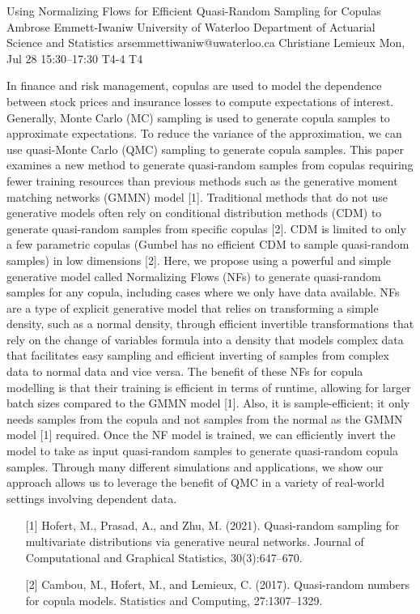\begin{talk}
  {Using Normalizing Flows for Efficient Quasi-Random Sampling for Copulas}%
  {Ambrose Emmett-Iwaniw}%
  {University of Waterloo Department of Actuarial Science and Statistics}%
  {arsemmettiwaniw@uwaterloo.ca}%
  {Christiane Lemieux}%
  {}%
  {Mon, Jul 28 15:30–17:30}%
  {T4-4}%
  {T4}%
  
				
			
In finance and risk management, copulas are used to model the dependence between stock prices and insurance losses to compute expectations of interest. Generally, Monte Carlo (MC) sampling is used to generate copula samples to approximate expectations. To reduce the variance of the approximation, we can use quasi-Monte Carlo (QMC) sampling to generate copula samples. This paper examines a new method to generate quasi-random samples from copulas requiring fewer training resources than previous methods such as the generative moment matching networks (GMMN) model [1]. Traditional methods that do not use generative models often rely on conditional distribution methods (CDM) to generate quasi-random samples from specific copulas [2]. CDM is limited to only a few parametric copulas (Gumbel has no efficient CDM to sample quasi-random samples) in low dimensions [2]. Here, we propose using a powerful and simple generative model called Normalizing Flows (NFs) to generate quasi-random samples for any copula, including cases where we only have data available. NFs are a type of explicit generative model that relies on transforming a simple density, such as a normal density, through efficient invertible transformations that rely on the change of variables formula into a density that models complex data that facilitates easy sampling and efficient inverting of samples from complex data to normal data and vice versa. The benefit of these NFs for copula modelling is that their training is efficient in terms of runtime, allowing for larger batch sizes compared to the GMMN model [1]. Also, it is sample-efficient; it only needs samples from the copula and not samples from the normal as the GMMN model [1] required. Once the NF model is trained, we can efficiently invert the model to take as input quasi-random samples to generate quasi-random copula samples. Through many different simulations and applications, we show our approach allows us to leverage the benefit of QMC in a variety of real-world settings involving dependent data.
\medskip

\begin{enumerate}
	\item[{[1]}] Hofert, M., Prasad, A., and Zhu, M. (2021). Quasi-random sampling for multivariate distributions via generative neural networks. Journal of Computational and Graphical Statistics,
30(3):647–670.
	\item[{[2]}] Cambou, M., Hofert, M., and Lemieux, C. (2017). Quasi-random numbers for copula models. Statistics and Computing, 27:1307–1329. 
\end{enumerate}
\end{talk}

